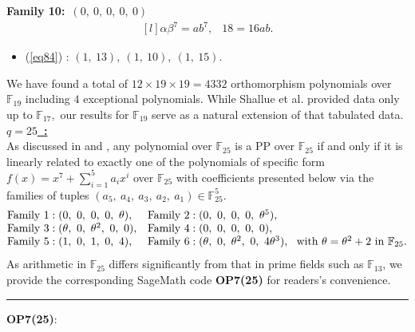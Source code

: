 \documentclass[12pt,a4wide, reqno]{amsart}
\theoremstyle{definition}
\theoremstyle{remark}
\numberwithin{equation}{section}
\begin{document}
    \textbf{Family 10:}~$(0,~0,~0,~0,~0)$ 
\begin{equation}\label{eq84}
    \begin{matrix*}[l]
         \alpha \beta ^7=ab^7, & 18=16ab.
    \end{matrix*}
\end{equation}
\begin{itemize}
    \item 
    (\ref{eq84}) : $(1,~13),~(1,~10),~(1,~15).$
    \end{itemize}
We have found a total of $12\times 19\times 19=4332$ orthomorphism polynomials over $\mathbb{F}_{19}$ including $4$ exceptional polynomials. While Shallue et al. \cite{shallue} provided data only up to $\mathbb{F}_{17},$ our results for $\mathbb{F}_{19}$ serve as a natural extension of that tabulated data.
\vspace{0.5 cm}
\\
\underline{\Large \textbf{$q=25$~:}}
\vspace{0.2cm}
\\
As discussed in  and , any polynomial over $\mathbb{F}_{25}$ is a PP over $\mathbb{F}_{25}$ if and only if it is linearly related to exactly one of the polynomials of specific form $f(x)=x^7+\sum_{i=1}^{5}a_ix^i$ over $\mathbb{F}_{25}$ with coefficients presented below via the families of tuples $(a_5,~a_4,~a_3,~a_2,~a_1)\in\mathbb{F}_{25}^5.$
\begin{equation*}
\begin{matrix*}[l]
     \textup{Family 1}:(0,~0,~0,~0,~\theta), & \textup{Family 2}:(0,~0,~0,~0,~\theta^5),\\
     \textup{Family 3}: (\theta,~0,~\theta^2,~0,~0),&\textup{Family 4}:(0,~0,~0,~0,~0), \\
     \textup{Family 5}:(1,~0,~1,~0,~4),& \textup{Family 6}: (\theta,~0,~\theta^2,~0,~4\theta^3),~~\textup{with}~\theta=\theta^2+2~\textup{in}~\mathbb{F}_{25}.\\
     \end{matrix*}
     \end{equation*}
As arithmetic in $\mathbb{F}_{25}$ differs significantly from that in prime fields such as $\mathbb{F}_{13}$, we provide the corresponding SageMath code \textbf{OP7(25)} for readers's convenience.
\newpage
 \vspace{0.5 cm}
 \hrule
 \vspace{0.2 cm}
 \textbf{OP7(25)}:
\end{document}
